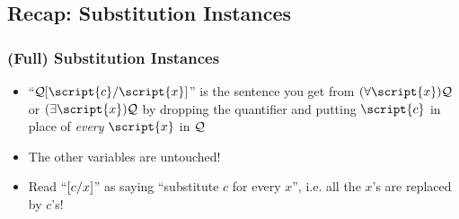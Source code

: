 \subsection{Recap: Substitution Instances} %

\begin{frame}
\frametitle{(Full) Substitution Instances}

\begin{itemize}

\item ``$\metav{Q}\substitute{\script{x}}{\script{c}}$'' is the sentence you get from $\qt{\forall}{\script{x}}\metav{Q}$ or $\qt{\exists}{\script{x}}\metav{Q}$ by dropping the quantifier and putting $\script{c}$ in place of \emph{every} $\script{x}$ in $\metav{Q}$


\item The other variables are untouched! 

\item Read ``$\substitute{x}{c}$'' as saying ``substitute $c$ for every $x$'', i.e. all the $x$'s are replaced by $c$'s! 



\end{itemize}
\end{frame}

